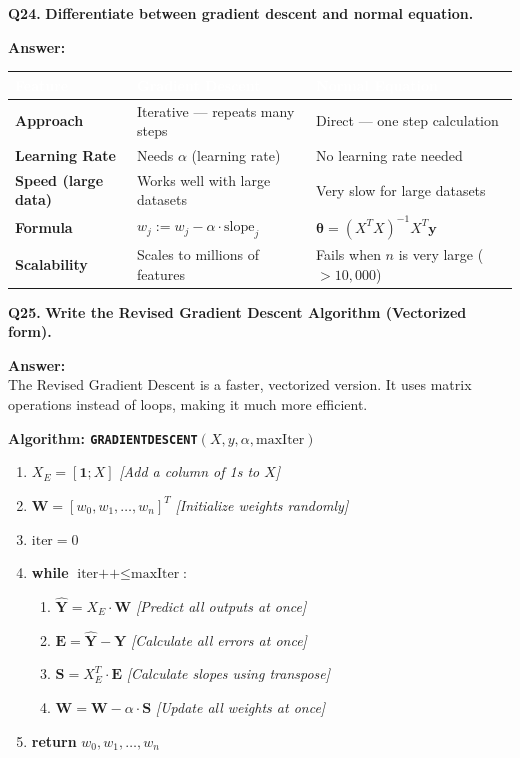 \documentclass[12pt,a4paper]{article}
\newcommand{\question}[2]{%
    \begin{mdframed}[style=questionstyle]
        \textbf{\textcolor{headerblue}{Q#1.}} \textbf{#2}
    \end{mdframed}%
    \vspace{2pt}%
}
\newcommand{\ans}{\textbf{\textcolor{headerblue}{Answer:}}\\[4pt]}
\newcommand{\subhead}[1]{\textbf{\textcolor{headerblue}{#1}}}
\begin{document}
\vspace{10pt}
\question{24}{Differentiate between gradient descent and normal equation.}

\ans

\begin{tabularx}{\textwidth}{|>{\bfseries}l|L|L|}
\hline
{}\textcolor{white}{\textbf{Feature}} & \textcolor{white}{\textbf{Gradient Descent}} & \textcolor{white}{\textbf{Normal Equation}} \\
\hline
Approach & Iterative --- repeats many steps & Direct --- one step calculation \\
\hline
Learning Rate & Needs $\alpha$ (learning rate) & No learning rate needed \\
\hline
Speed (large data) & Works well with large datasets & Very slow for large datasets \\
\hline
Formula & $w_j := w_j - \alpha \cdot \text{slope}_j$ & $\boldsymbol{\theta} = (X^T X)^{-1} X^T \mathbf{y}$ \\
\hline
Scalability & Scales to millions of features & Fails when $n$ is very large ($> 10{,}000$) \\
\hline
\end{tabularx}

\vspace{10pt}
\question{25}{Write the Revised Gradient Descent Algorithm (Vectorized form).}

\ans

The Revised Gradient Descent is a faster, vectorized version. It uses matrix operations instead of loops, making it much more efficient.

\subhead{Algorithm: \texttt{GRADIENTDESCENT}$(X, y, \alpha, \text{maxIter})$}

\begin{enumerate}[leftmargin=*]
    \item $X_E = [\mathbf{1}; X]$ \hfill \textit{[Add a column of 1s to $X$]}
    \item $\mathbf{W} = [w_0, w_1, \ldots, w_n]^T$ \hfill \textit{[Initialize weights randomly]}
    \item $\text{iter} = 0$
    \item \textbf{while} $\text{iter++} \leq \text{maxIter}$:
    \begin{enumerate}
        \item $\hat{\mathbf{Y}} = X_E \cdot \mathbf{W}$ \hfill \textit{[Predict all outputs at once]}
        \item $\mathbf{E} = \hat{\mathbf{Y}} - \mathbf{Y}$ \hfill \textit{[Calculate all errors at once]}
        \item $\mathbf{S} = X_E^T \cdot \mathbf{E}$ \hfill \textit{[Calculate slopes using transpose]}
        \item $\mathbf{W} = \mathbf{W} - \alpha \cdot \mathbf{S}$ \hfill \textit{[Update all weights at once]}
    \end{enumerate}
    \item \textbf{return} $w_0, w_1, \ldots, w_n$
\end{enumerate}
\end{document}
